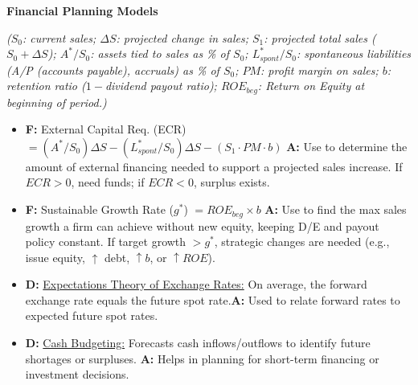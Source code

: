 \documentclass[7pt,landscape]{extarticle} %
\newcommand{\cheatsheetsubsubsection}[1]{%
  \vspace{0.15ex plus 0.05ex minus 0.05ex}%
  \noindent\textbf{\sffamily\scriptsize #1}%
  \par\vspace{0.05ex}%
}
\newcommand{\D}[1]{\textbf{\textcolor{DefColor}{D:}} \uline{#1}}
\newcommand{\F}[1]{\textbf{\textcolor{FormColor}{F:}} #1}
\newcommand{\A}[1]{\textbf{\textcolor{AppColor}{A:}} #1}
\newcommand{\SF}[1]{\textit{\small (#1)}} %
\begin{document}
\begin{multicols*}{4}
  \cheatsheetsubsubsection{Financial Planning Models}
  \SF{$S_0$: current sales; $\Delta S$: projected change in sales; $S_1$: projected total sales ($S_0+\Delta S$); $A^*/S_0$: assets tied to sales as \% of $S_0$; $L^*_{spont}/S_0$: spontaneous liabilities (A/P (accounts payable), accruals) as \% of $S_0$; $PM$: profit margin on sales; $b$: retention ratio ($1-$dividend payout ratio); $ROE_{beg}$: Return on Equity at beginning of period.}
  \begin{itemize}
    \item \F{External Capital Req. (ECR) $= (A^*/S_0)\Delta S - (L^*_{spont}/S_0)\Delta S - (S_1 \cdot PM \cdot b)$}
          \A{Use to determine the amount of external financing needed to support a projected sales increase. If $ECR>0$, need funds; if $ECR<0$, surplus exists.}
    \item \F{Sustainable Growth Rate ($g^*$) $= ROE_{beg} \times b$}
          \A{Use to find the max sales growth a firm can achieve without new equity, keeping D/E and payout policy constant. If target growth $>g^*$, strategic changes are needed (e.g., issue equity, $\uparrow$ debt, $\uparrow b$, or $\uparrow ROE$).}
    \item \D{Expectations Theory of Exchange Rates:} On average, the forward exchange rate equals the future spot rate.\A{Used to relate forward rates to expected future spot rates.}
    \item \D{Cash Budgeting:} Forecasts cash inflows/outflows to identify future shortages or surpluses. \A{Helps in planning for short-term financing or investment decisions.}
  \end{itemize}


\end{multicols*}
\end{document}
